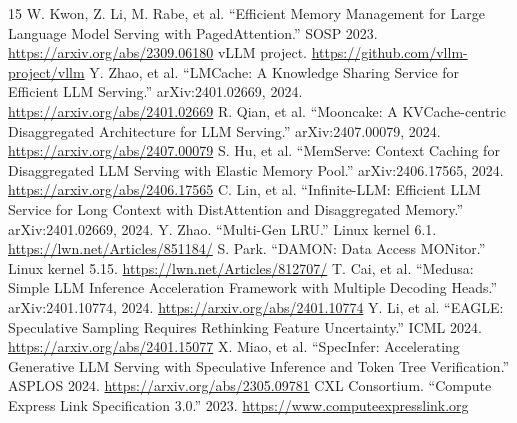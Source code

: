 \documentclass[10pt,twocolumn]{article}
\begin{document}
\begin{thebibliography}{15}
W. Kwon, Z. Li, M. Rabe, et al. ``Efficient Memory Management for Large Language Model Serving with PagedAttention.'' SOSP 2023. \url{https://arxiv.org/abs/2309.06180}
vLLM project. \url{https://github.com/vllm-project/vllm}
Y. Zhao, et al. ``LMCache: A Knowledge Sharing Service for Efficient LLM Serving.'' arXiv:2401.02669, 2024. \url{https://arxiv.org/abs/2401.02669}
R. Qian, et al. ``Mooncake: A KVCache-centric Disaggregated Architecture for LLM Serving.'' arXiv:2407.00079, 2024. \url{https://arxiv.org/abs/2407.00079}
S. Hu, et al. ``MemServe: Context Caching for Disaggregated LLM Serving with Elastic Memory Pool.'' arXiv:2406.17565, 2024. \url{https://arxiv.org/abs/2406.17565}
C. Lin, et al. ``Infinite-LLM: Efficient LLM Service for Long Context with DistAttention and Disaggregated Memory.'' arXiv:2401.02669, 2024.
Y. Zhao. ``Multi-Gen LRU.'' Linux kernel 6.1. \url{https://lwn.net/Articles/851184/}
S. Park. ``DAMON: Data Access MONitor.'' Linux kernel 5.15. \url{https://lwn.net/Articles/812707/}
T. Cai, et al. ``Medusa: Simple LLM Inference Acceleration Framework with Multiple Decoding Heads.'' arXiv:2401.10774, 2024. \url{https://arxiv.org/abs/2401.10774}
Y. Li, et al. ``EAGLE: Speculative Sampling Requires Rethinking Feature Uncertainty.'' ICML 2024. \url{https://arxiv.org/abs/2401.15077}
X. Miao, et al. ``SpecInfer: Accelerating Generative LLM Serving with Speculative Inference and Token Tree Verification.'' ASPLOS 2024. \url{https://arxiv.org/abs/2305.09781}
CXL Consortium. ``Compute Express Link Specification 3.0.'' 2023. \url{https://www.computeexpresslink.org}
\end{thebibliography}
\end{document}
